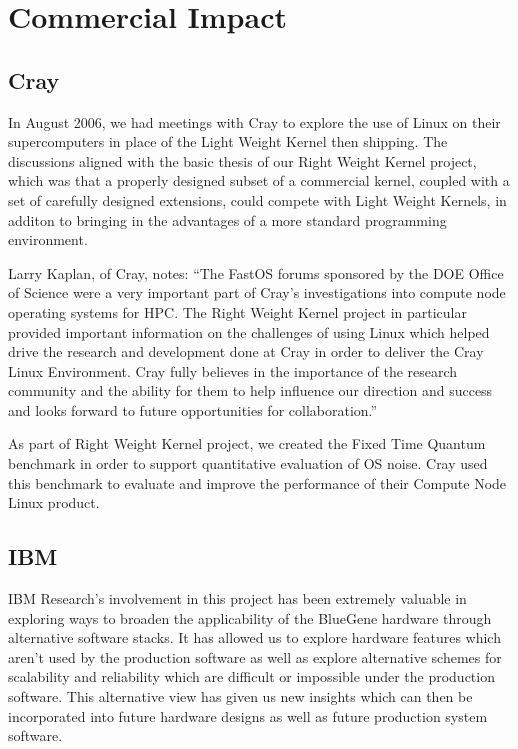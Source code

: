 \chapter{Commercial Impact}
\section{Cray}
In August 2006, we had meetings with Cray to explore the use of Linux on their supercomputers 
in place of the Light Weight Kernel then shipping. The discussions aligned with the 
basic thesis of our Right Weight Kernel project, which was that a properly designed 
subset of a commercial kernel, coupled with a set of carefully designed extensions, could 
compete with Light Weight Kernels, in additon to bringing in the advantages of a more
standard programming environment. 

Larry Kaplan, of Cray, notes: ``The FastOS forums sponsored by the DOE
Office of Science were a very important part of Cray's investigations
into compute node operating systems for HPC.  The Right Weight Kernel
project in particular provided important information on the challenges
of using Linux which helped drive the research and development done at
Cray in order to deliver the Cray Linux Environment.  Cray fully
believes in the importance of the research community and the ability
for them to help influence our direction and success and looks forward
to future opportunities for collaboration.''

As part of Right Weight Kernel project, we created the Fixed Time
Quantum\cite{ftq} benchmark in order to support quantitative
evaluation of OS noise. Cray used this benchmark to evaluate and
improve the performance of their Compute Node Linux
product\cite{kaplan2007cray}.


\section{IBM}
IBM Research's involvement in this project has been extremely valuable in exploring
ways to broaden the applicability of the BlueGene hardware through alternative software
stacks.  It has allowed us to explore hardware features which aren't used by the production
software as well as explore alternative schemes for scalability and reliability which are
difficult or impossible under the production software.  This alternative view has given us
new insights which can then be incorporated into future hardware designs as well as future
production system software.

